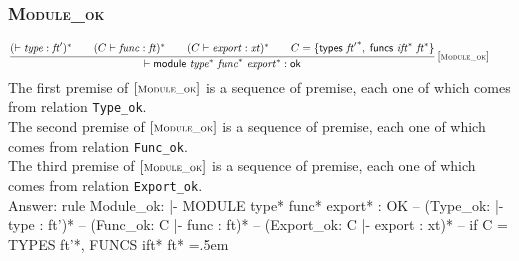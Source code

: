 \documentclass{article}
\newenvironment{lcverbatim}
 {\SaveVerbatim{cverb}}
 {\endSaveVerbatim
  \flushleft\fboxrule=0pt\fboxsep=.5em
  \colorbox{cverbbg}{%
    \makebox[\dimexpr\linewidth-2\fboxsep][l]{\BUseVerbatim{cverb}}%
  }
  \endflushleft
}
\newcommand\K[1]{\texttt{#1}}
\begin{document}
\subsubsection{\normalfont\normalsize\textsc {Module\_ok}}
$$
\begin{array}{@{}c@{}}\displaystyle
\frac{
({ \vdash }\;{\mathit{type}} : {\mathit{ft}'})^\ast
 \qquad
(C \vdash {\mathit{func}} : {\mathit{ft}})^\ast
 \qquad
(C \vdash {\mathit{export}} : {\mathit{xt}})^\ast
 \qquad
C = \{ \begin{array}[t]{@{}l@{}}
\mathsf{types}~{{\mathit{ft}'}^\ast},\; \mathsf{funcs}~{{\mathit{ift}}^\ast}~{{\mathit{ft}}^\ast} \}\end{array}
}{
{ \vdash }\;\mathsf{module}~{{\mathit{type}}^\ast}~{{\mathit{func}}^\ast}~{{\mathit{export}}^\ast} : \mathsf{ok}
} \, {[\textsc{\scriptsize Module\_ok}]}
\qquad
\end{array}
$$
The first premise of $[\textsc{\scriptsize Module\_ok}]$ is a sequence of premise, each one of which comes from relation \K{Type\_ok}. \\
The second premise of $[\textsc{\scriptsize Module\_ok}]$ is a sequence of premise, each one of which comes from relation \K{Func\_ok}. \\
The third premise of $[\textsc{\scriptsize Module\_ok}]$ is a sequence of premise, each one of which comes from relation \K{Export\_ok}. \\
{\color{red}
	Answer:
	\begin{lcverbatim}
rule Module_ok:
  |- MODULE type* func* export* : OK
  -- (Type_ok: |- type : ft')*
  -- (Func_ok: C |- func : ft)*
  -- (Export_ok: C |- export : xt)*
  -- if C = {TYPES ft'*, FUNCS ift* ft*}
	\end{lcverbatim}
}
\end{document}
